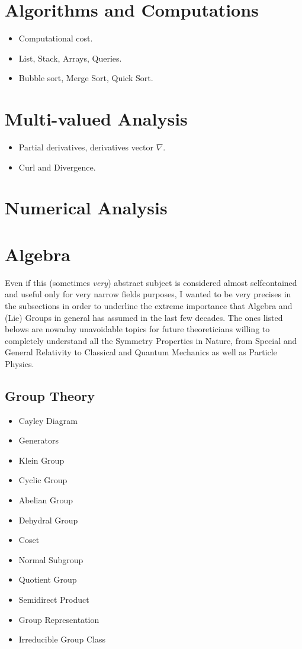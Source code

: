 \documentclass[10pt]{article}
\begin{document}
\section{Algorithms and Computations}
\begin{itemize}
	\item Computational cost.
	\item List, Stack, Arrays, Queries.
	\item Bubble sort, Merge Sort, Quick Sort.
\end{itemize}
\section{Multi-valued Analysis}
\begin{itemize}
	\item Partial derivatives, derivatives vector $ \nabla $.
	\item Curl and Divergence. 
\end{itemize}
\section{Numerical Analysis}
\section{Algebra}
Even if this (sometimes \emph{very}) abstract subject is considered almost selfcontained and useful only for very narrow fields purposes, I wanted to be very precises in the subsections in order to underline the extreme importance that Algebra and (Lie) Groups in general has assumed in the last few decades. The ones listed belows are nowaday unavoidable topics for future theoreticians willing to completely understand all the Symmetry Properties in Nature, from Special and General Relativity to Classical and Quantum Mechanics as well as Particle Physics. 
\subsection{Group Theory}
\begin{itemize}
\item Cayley Diagram
\item Generators
\item Klein Group
\item Cyclic Group
\item Abelian Group
\item Dehydral Group
\item Coset
\item Normal Subgroup
\item Quotient Group
\item Semidirect Product
\item Group Representation 
\item Irreducible Group Class
\end{itemize}
\end{document}
